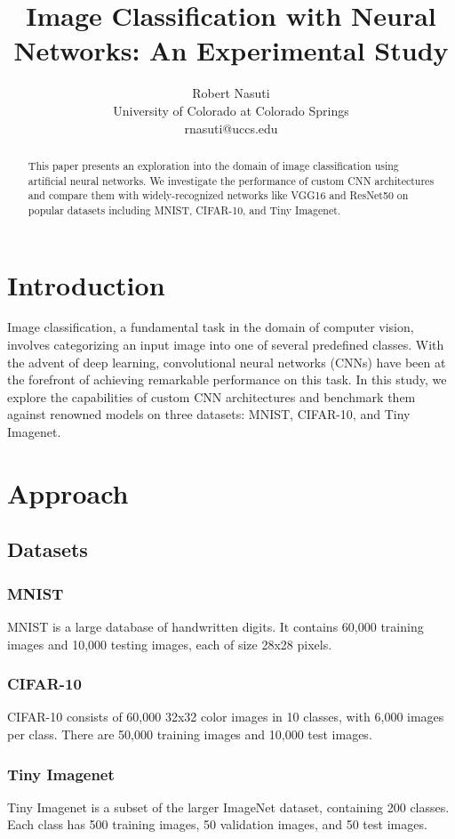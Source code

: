 \documentclass[letterpaper]{article}
\title{Image Classification with Neural Networks: An Experimental Study}
\author{Robert Nasuti\\
University of Colorado at Colorado Springs\\
rnasuti@uccs.edu}
\begin{document}
\maketitle

\begin{abstract}
This paper presents an exploration into the domain of image classification using artificial neural networks. We investigate the performance of custom CNN architectures and compare them with widely-recognized networks like VGG16 and ResNet50 on popular datasets including MNIST, CIFAR-10, and Tiny Imagenet.
\end{abstract}

\section{Introduction}
Image classification, a fundamental task in the domain of computer vision, involves categorizing an input image into one of several predefined classes. With the advent of deep learning, convolutional neural networks (CNNs) have been at the forefront of achieving remarkable performance on this task. In this study, we explore the capabilities of custom CNN architectures and benchmark them against renowned models on three datasets: MNIST, CIFAR-10, and Tiny Imagenet.

\section{Approach}

\subsection{Datasets}

\subsubsection{MNIST}
MNIST is a large database of handwritten digits. It contains 60,000 training images and 10,000 testing images, each of size 28x28 pixels.

\subsubsection{CIFAR-10}
CIFAR-10 consists of 60,000 32x32 color images in 10 classes, with 6,000 images per class. There are 50,000 training images and 10,000 test images.

\subsubsection{Tiny Imagenet}
Tiny Imagenet is a subset of the larger ImageNet dataset, containing 200 classes. Each class has 500 training images, 50 validation images, and 50 test images.
\end{document}

